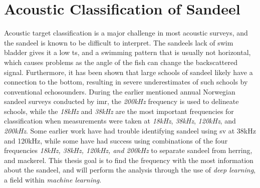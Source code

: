     
    
\section{Acoustic Classification of Sandeel}

Acoustic target classification is a major challenge in most acoustic surveys\cite{sizedependentfreqrespons2009johnsen}, and the sandeel is known to be difficult to interpret. The sandeels lack of swim bladder gives it a low \gls{ts}, and a swimming pattern that is usually not horizontal, which causes problems as the angle of the fish can change the backscattered signal\cite{Forland2014Broadbandwidth}. Furthermore, it has been shown that large schools of sandeel likely have a connection to the bottom, resulting in severe underestimates of such schools by conventional echosounders\cite{johnsen2017collective}. During the earlier mentioned annual Norwegian sandeel surveys conducted by \gls{imr}, the \textit{200kHz} frequency is used to delineate schools, while the \textit{18kHz} and \textit{38kHz} are the most important frequencies for classification when measurements were taken at \textit{18kHz}, \textit{38kHz}, \textit{120kHz}, and \textit{200kHz}\cite{sizedependentfreqrespons2009johnsen}. Some earlier work have had trouble identifying sandeel using \gls{sv} at 38kHz and 120kHz\cite{hassel2004influence,mackinson2005using,mosteiro2004dual,Greenstreet}, while some have had success using combinations of the four frequencies \textit{18kHz, 38kHz, 120kHz, and 200kHz} to separate sandeel from herring, and mackerel\cite{mohammed2006acoustic}. This thesis goal is to find the frequency with the most information about the sandeel, and will perform the analysis through the use of \textit{deep learning}, a field within \textit{machine learning}.

